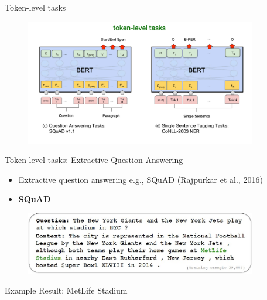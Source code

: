 \documentclass[serif, aspectratio=169]{beamer}
\begin{document}
\begin{frame}{Token-level tasks}
    \begin{figure}
        \centering
        \includegraphics[width=0.9\textwidth]{Figures/token-level-tasks.png}
    \end{figure}
\end{frame}

\begin{frame}{Token-level tasks: Extractive Question Answering}

    \begin{itemize}
        \item Extractive question answering e.g., SQuAD (\textcolor{green!50!black}{Rajpurkar et al., 2016})
    \end{itemize}
    
    \begin{itemize}
        \item[] \setlength{\fboxsep}{2pt}\colorbox{yellow!30}{\textbf{SQuAD}}
    \end{itemize}
    
    \vspace{0.2cm}
    
    \begin{figure}[h]
        \centering
        \includegraphics[width=0.9\textwidth]{Figures/tk-task.png}
    \end{figure}
    
    \hspace{1cm} Example Result: MetLife Stadium
\end{frame}
\end{document}
